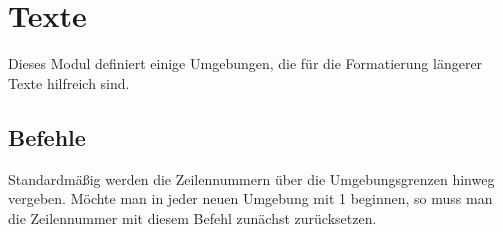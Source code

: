 \section{Texte}
\label{modul:texte}
Dieses Modul definiert einige Umgebungen, die für die Formatierung
längerer Texte hilfreich sind. 


\subsection{Befehle}
\begin{commands}
		Standardmäßig werden die Zeilennummern über die
		Umgebungsgrenzen hinweg vergeben. Möchte man in jeder neuen
		Umgebung mit 1 beginnen, so muss man die Zeilennummer mit
		diesem Befehl zunächst zurücksetzen.
\end{commands}

